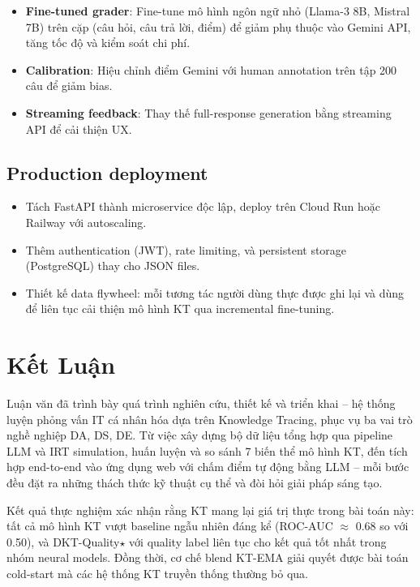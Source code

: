 \begin{itemize}
  \item \textbf{Fine-tuned grader}: Fine-tune mô hình ngôn ngữ nhỏ (Llama-3 8B, Mistral 7B) trên cặp (câu hỏi, câu trả lời, điểm) để giảm phụ thuộc vào Gemini API, tăng tốc độ và kiểm soát chi phí.
  \item \textbf{Calibration}: Hiệu chỉnh điểm Gemini với human annotation trên tập 200 câu để giảm bias.
  \item \textbf{Streaming feedback}: Thay thế full-response generation bằng streaming API để cải thiện UX.
\end{itemize}

\subsection{Production deployment}

\begin{itemize}
  \item Tách FastAPI thành microservice độc lập, deploy trên Cloud Run hoặc Railway với autoscaling.
  \item Thêm authentication (JWT), rate limiting, và persistent storage (PostgreSQL) thay cho JSON files.
  \item Thiết kế data flywheel: mỗi tương tác người dùng thực được ghi lại và dùng để liên tục cải thiện mô hình KT qua incremental fine-tuning.
\end{itemize}

\section{Kết Luận}
\label{sec:final_conclusion}

Luận văn đã trình bày quá trình nghiên cứu, thiết kế và triển khai \system{} -- hệ thống luyện phỏng vấn IT cá nhân hóa dựa trên Knowledge Tracing, phục vụ ba vai trò nghề nghiệp DA, DS, DE. Từ việc xây dựng bộ dữ liệu tổng hợp qua pipeline LLM và IRT simulation, huấn luyện và so sánh 7 biến thể mô hình KT, đến tích hợp end-to-end vào ứng dụng web với chấm điểm tự động bằng LLM -- mỗi bước đều đặt ra những thách thức kỹ thuật cụ thể và đòi hỏi giải pháp sáng tạo.

Kết quả thực nghiệm xác nhận rằng KT mang lại giá trị thực trong bài toán này: tất cả mô hình KT vượt baseline ngẫu nhiên đáng kể (ROC-AUC $\approx$ 0.68 so với 0.50), và DKT-Quality$\star$ với quality label liên tục cho kết quả tốt nhất trong nhóm neural models. Đồng thời, cơ chế blend KT-EMA giải quyết được bài toán cold-start mà các hệ thống KT truyền thống thường bỏ qua.

